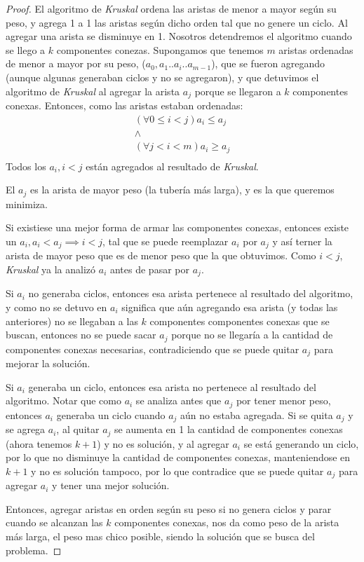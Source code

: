 \begin{proof}
	El algoritmo de \emph{Kruskal} ordena las aristas de menor a mayor seg\'un su peso, y agrega 1 a 1 las aristas seg\'un dicho orden tal que no genere un ciclo. Al agregar una arista se disminuye en 1.  Nosotros detendremos el algoritmo cuando se llego a $k$ componentes conezas.
	Supongamos que tenemos $m$ aristas ordenadas de menor a mayor por su peso, ($a_0, a_1 .. a_i .. a_{m-1}$), que se fueron agregando (aunque algunas generaban ciclos y no se agregaron), y que detuvimos el algoritmo de \emph{Kruskal} al agregar la arista $a_j$ porque se llegaron a $k$ componentes conexas. Entonces, como las aristas estaban ordenadas:
	\begin{equation*}
	\begin{split}
		(\forall 0 \leq i < j) a_i \leq a_j \\
		\land \\
		(\forall j < i < m) a_i \geq a_j \\
	\end{split}
	\end{equation*}
	Todos los $a_i, i < j$ est\'an agregados al resultado de \emph{Kruskal}.

	El $a_j$ es la arista de mayor peso (la tuber\'ia m\'as larga), y es la que queremos minimiza.

	Si existiese una mejor forma de armar las componentes conexas, entonces existe un $a_i, a_i < a_j \implies i < j$, tal que se puede reemplazar $a_i$ por $a_j$ y as\'i terner la arista de mayor peso que es de menor peso que la que obtuvimos. Como $i < j$, \emph{Kruskal} ya la analiz\'o $a_i$ antes de pasar por $a_j$.

	Si $a_i$ no generaba ciclos, entonces esa arista pertenece al resultado del algoritmo, y como no se detuvo en $a_i$ significa que a\'un agregando esa arista (y todas las anteriores) no se llegaban a las $k$ componentes componentes conexas que se buscan, entonces no se puede sacar $a_j$ porque no se llegar\'ia a la cantidad de componentes conexas necesarias, contradiciendo que se puede quitar $a_j$ para mejorar la soluci\'on.

	Si $a_i$ generaba un ciclo, entonces esa arista no pertenece al resultado del algoritmo. Notar que como $a_i$ se analiza antes que $a_j$ por tener menor peso, entonces $a_i$ generaba un ciclo cuando $a_j$ a\'un no estaba agregada. Si se quita $a_j$ y se agrega $a_i$, al quitar $a_j$ se aumenta en 1 la cantidad de componentes conexas (ahora tenemos $k + 1$) y no es soluci\'on, y al agregar $a_i$ se est\'a generando un ciclo, por lo que no disminuye la cantidad de componentes conexas, manteniendose en $k + 1$ y no es soluci\'on tampoco, por lo que contradice que se puede quitar $a_j$ para agregar $a_i$ y tener una mejor soluci\'on.

	Entonces, agregar aristas en orden seg\'un su peso si no genera ciclos y parar cuando se alcanzan las $k$ componentes conexas, nos da como peso de la arista m\'as larga, el peso mas chico posible, siendo la soluci\'on que se busca del problema.

\end{proof}

